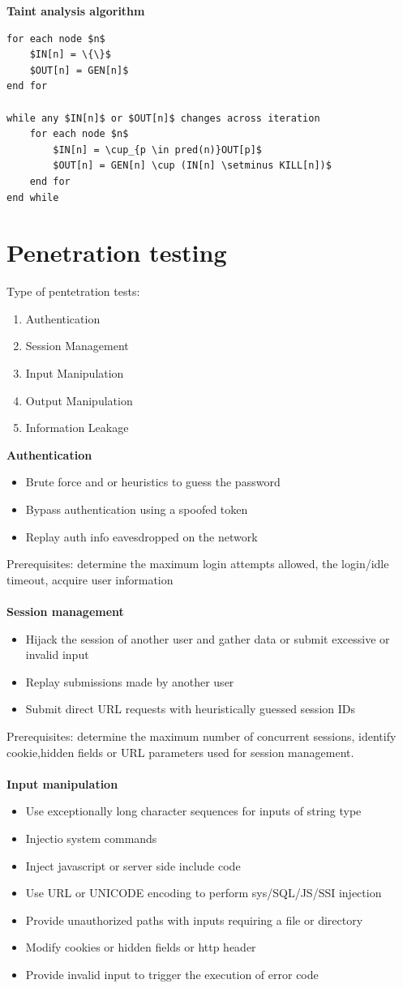 \documentclass[10pt,a4paper]{article}
\begin{document}
\textbf{Taint analysis algorithm}
\begin{lstlisting}[frame=lines]
for each node $n$
	$IN[n] = \{\}$
	$OUT[n] = GEN[n]$
end for

while any $IN[n]$ or $OUT[n]$ changes across iteration
	for each node $n$
		$IN[n] = \cup_{p \in pred(n)}OUT[p]$
		$OUT[n] = GEN[n] \cup (IN[n] \setminus KILL[n])$
	end for
end while
\end{lstlisting}
\newpage
\section{Penetration testing}
Type of pentetration tests:
\begin{enumerate}
\item Authentication
\item Session Management
\item Input Manipulation
\item Output Manipulation
\item Information Leakage
\end{enumerate}
\textbf{Authentication}
\begin{itemize}
\item Brute force and or heuristics to guess the password
\item Bypass authentication using a spoofed token
\item Replay auth info eavesdropped on the network
\end{itemize} 
Prerequisites: determine the maximum login attempts allowed, the login/idle timeout, acquire user information\\\\
\textbf{Session management}
\begin{itemize}
\item Hijack the session of another user and gather data or submit excessive or invalid input
\item Replay submissions made by another user
\item Submit direct URL requests with heuristically guessed session IDs
\end{itemize}
Prerequisites: determine the maximum number of concurrent sessions, identify cookie,hidden fields or URL parameters used for session management.\\\\
\textbf{Input manipulation}\\
\begin{itemize}
\item Use exceptionally long character sequences for inputs of string type
\item Injectio system commands
\item Inject javascript or server side include code
\item Use URL or UNICODE encoding to perform sys/SQL/JS/SSI injection
\item Provide unauthorized paths with inputs requiring a file or directory
\item Modify cookies or hidden fields or http header
\item Provide invalid input to trigger the execution of error code
\end{itemize}
\end{document}
